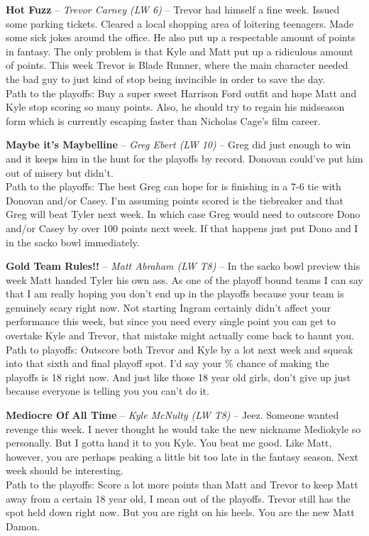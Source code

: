 \documentclass[11pt,letterpaper]{article}
\begin{document}
\begin{etaremune}
\setcounter{enumi}{10}
\item \textbf{Hot Fuzz} -- \textit{Trevor Carney (LW 6)} -- Trevor had himself a fine week. Issued some parking tickets. Cleared a local shopping area of loitering teenagers. Made some sick jokes around the office. He also put up a respectable amount of points in fantasy. The only problem is that Kyle and Matt put up a ridiculous amount of points. This week Trevor is Blade Runner, where the main character needed the bad guy to just kind of stop being invincible in order to save the day.
\medskip\\Path to the playoffs: Buy a super sweet Harrison Ford outfit and hope Matt and Kyle stop scoring so many points. Also, he should try to regain his midseason form which is currently escaping faster than Nicholas Cage's film career.
\item \textbf{Maybe it's Maybelline} -- \textit{Greg Ebert (LW 10)} -- Greg did just enough to win and it keeps him in the hunt for the playoffs by record. Donovan could've put him out of misery but didn't.
\medskip\\Path to the playoffs: The best Greg can hope for is finishing in a 7-6 tie with Donovan and/or Casey. I'm assuming points scored is the tiebreaker and that Greg will beat Tyler next week. In which case Greg would need to outscore Dono and/or Casey by over 100 points next week. If that happens just put Dono and I in the sacko bowl immediately.
\item \textbf{Gold Team Rules!!} -- \textit{Matt Abraham (LW T8)} -- In the sacko bowl preview this week Matt handed Tyler his own ass. As one of the playoff bound teams I can say that I am really hoping you don't end up in the playoffs because your team is genuinely scary right now. Not starting Ingram certainly didn't affect your performance this week, but since you need every single point you can get to overtake Kyle and Trevor, that mistake might actually come back to haunt you.
\medskip\\Path to playoffs: Outscore both Trevor and Kyle by a lot next week and squeak into that sixth and final playoff spot. I'd say your \% chance of making the playoffs is 18 right now. And just like those 18 year old girls, don't give up just because everyone is telling you you can't do it.
\item \textbf{Mediocre Of All Time} -- \textit{Kyle McNulty (LW T8)} -- Jeez. Someone wanted revenge this week. I never thought he would take the new nickname Mediokyle so personally. But I gotta hand it to you Kyle. You beat me good. Like Matt, however, you are perhaps peaking a little bit too late in the fantasy season. Next week should be interesting.
\medskip\\Path to the playoffs: Score a lot more points than Matt and Trevor to keep Matt away from a certain 18 year old, I mean out of the playoffs. Trevor still has the spot held down right now. But you are right on his heels. You are the new Matt Damon.
\end{etaremune}
\end{document}
